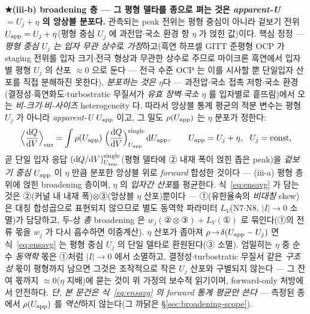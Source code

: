 \textbf{★(iii-b) broadening 층 --- 그 평형 델타를 종으로 펴는 것은 \emph{apparent-U $=U_j+\eta$} 의 앙상블 분포다.} 관측되는 peak
전위는 평형 중심이 아니라 겉보기 전위 $U_{\mathrm{app}}=U_j+\eta$(평형 중심 $U_j$ 에 과전압$\cdot$국소 환경 항 $\eta$ 가 얹힌
값)이다. 핵심 정정 --- \emph{평형 중심 $U_j$ 는 입자 무관 상수}로 \emph{가정}하고(흑연 하프셀 GITT 준평형 OCP 가 staging 전위를
입자 크기$\cdot$전극 형상과 무관한 상수로 주므로\cite{park2021} 마이크론 흑연에서 입자별 평형 $U_j$ 의 산포 $\approx0$ 으로 둔다 ---
전극 수준 OCP 는 이를 시사할 뿐 단일입자 산포를 직접 분해하진 못한다), \emph{분포하는 것은 $\eta$}다 ---
과전압$\cdot$국소 접촉 저항$\cdot$국소 환경(결정성$\cdot$흑연화도$\cdot$turbostratic 무질서가 \emph{유효 장벽$\cdot$국소
$\eta$} 를 입자별로 흩뜨림)에서 오는 \emph{비-크기$\cdot$비-사이즈} heterogeneity 다. 따라서 앙상블 통계 평균의 적분
변수는 평형 $U_j$ 가 아니라 \emph{apparent-U} $U_{\mathrm{app}}$ 이고, 그 밀도 $\rho(U_{\mathrm{app}})$ 는 $\eta$ 분포가 정한다:
\begin{equation}
\Big\langle\frac{\mathrm{d} Q}{\mathrm{d} V}\Big\rangle_\mathrm{ens}
=\int \rho(U_{\mathrm{app}})\;\Big(\frac{\mathrm{d} Q}{\mathrm{d} V}\Big)^\mathrm{single}_{U_{\mathrm{app}}}\,\mathrm{d} U_{\mathrm{app}},
\qquad U_{\mathrm{app}}=U_j+\eta,\ \ U_j=\text{const},
\label{eq:ensavg}
\end{equation}
곧 단일 입자 응답 $(\mathrm{d} Q/\mathrm{d} V)^\mathrm{single}_{U_{\mathrm{app}}}$(평형 델타에 ② 내재 폭이 얹힌 좁은 peak)을 \emph{겉보기 중심}
$U_{\mathrm{app}}$ 이 $\eta$ 만큼 분포한 앙상블 위로 \emph{forward} 합성한 것이다 --- (iii-a) 평형 층 위에 얹힌
broadening 층이며, $\eta$ 의 \emph{입자간 산포}를 평균한다. 식~\eqref{eq:ensavg} 가 담는 것은
②(커널 내 내재 폭)$\otimes$③(앙상블 $\eta$ 산포)뿐이다 --- ①(유한율속의 \emph{비대칭} skew)은 대칭 합성곱으로
표현되지 않으므로 별도 동역학 파라미터 $L_V$(N7$\cdot$N8, $|I|\!\to\!0$ 소멸)가 담당하고, 두-상 \emph{총}
broadening 은 $w_j(\text{②}\otimes\text{③})+L_V(\text{①})$ 로 묶인다(①의 전류 몫을 $w_j$ 가 다시 흡수하면
이중계산). $\eta$ 산포가 좁아져 $\rho\!\to\!\delta(U_{\mathrm{app}}-U_j)$ 면 식~\eqref{eq:ensavg} 는 평형 중심 $U_j$
의 단일 델타로 환원된다(③ 소멸).
엄밀히는 $\eta$ 중 순수 \emph{동역학} 몫은 ①처럼 $|I|\!\to\!0$ 에서 소멸하고, 결정성$\cdot$turbostratic 무질서 같은
\emph{구조성} 몫이 평형까지 남으면 그것은 조작적으로 작은 $U_j$ 산포와 구별되지 않는다 --- 그 잔여 몫까지
$\approx0$($\eta$ 지배)에 묻는 것이 위 가정의 보수적 읽기이며, forward-only 처방에서 안전하다. \emph{단, 본 문건은 식~\eqref{eq:ensavg} 의 forward 통계 평균만
쓴다} --- 측정된 종에서 $\rho(U_{\mathrm{app}})$ 를 \emph{역산}하지 않는다(그 까닭은 \S\ref{sec:broadening-scope}).

